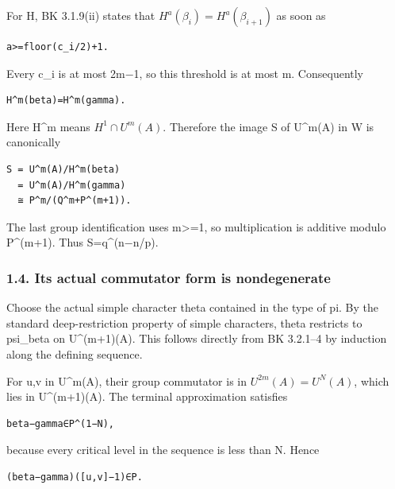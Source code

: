 For H, BK 3.1.9(ii) states that
\(H^a(\beta_i)=H^a(\beta_{i+1})\) as soon as

\begin{Verbatim}[fontsize=\small,breaklines=true,breakanywhere=true]
a>=floor(c_i/2)+1.
\end{Verbatim}

Every c\_i is at most 2m−1, so this threshold is at most m. Consequently

\begin{Verbatim}[fontsize=\small,breaklines=true,breakanywhere=true]
H^m(beta)=H^m(gamma).
\end{Verbatim}

Here H\^{}m means \(H^1\cap U^m(A)\). Therefore the image S of
U\^{}m(A) in W is canonically

\begin{Verbatim}[fontsize=\small,breaklines=true,breakanywhere=true]
S = U^m(A)/H^m(beta)
  = U^m(A)/H^m(gamma)
  ≅ P^m/(Q^m+P^(m+1)).
\end{Verbatim}

The last group identification uses m\textgreater=1, so multiplication is
additive modulo P\^{}(m+1). Thus \textbar S\textbar=q\^{}(n−n/p).

\hypertarget{odd_capacity-its-actual-commutator-form-is-nondegenerate}{%
\subsubsection{1.4. Its actual commutator form is
nondegenerate}\label{odd_capacity-its-actual-commutator-form-is-nondegenerate}}

Choose the actual simple character theta contained in the type of pi. By
the standard deep-restriction property of simple characters, theta
restricts to psi\_beta on U\^{}(m+1)(A). This follows directly from BK
3.2.1--4 by induction along the defining sequence.

For u,v in U\^{}m(A), their group commutator is in
\(U^{2m}(A)=U^N(A)\), which lies in U\^{}(m+1)(A). The
terminal approximation satisfies

\begin{Verbatim}[fontsize=\small,breaklines=true,breakanywhere=true]
beta−gamma∈P^(1−N),
\end{Verbatim}

because every critical level in the sequence is less than N. Hence

\begin{Verbatim}[fontsize=\small,breaklines=true,breakanywhere=true]
(beta−gamma)([u,v]−1)∈P.
\end{Verbatim}

